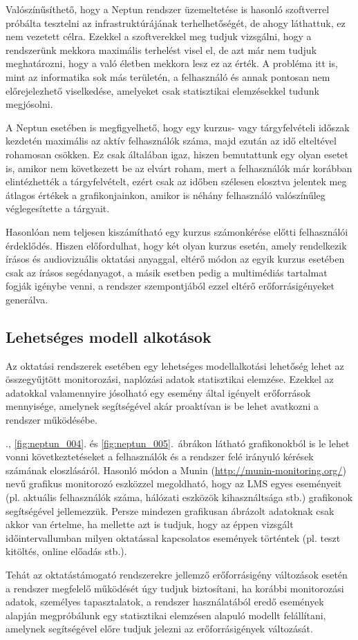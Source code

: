 Valószínűsíthető, hogy a Neptun rendszer üzemeltetése is hasonló szoftverrel próbálta tesztelni az infrastruktúrájának terhelhetőségét, de ahogy láthattuk, ez nem vezetett célra. Ezekkel a szoftverekkel meg tudjuk vizsgálni, hogy a rendszerünk mekkora maximális terhelést visel el, de azt már nem tudjuk meghatározni, hogy a való életben mekkora lesz ez az érték. A probléma itt is, mint az informatika sok más területén, a felhasználó és annak pontosan nem előrejelezhető viselkedése, amelyeket csak statisztikai elemzésekkel tudunk megjósolni.

A Neptun esetében is megfigyelhető, hogy egy kurzus- vagy tárgyfelvételi időszak kezdetén maximális az aktív felhasználók száma, majd ezután az idő elteltével rohamosan csökken. Ez csak általában igaz, hiszen bemutattunk egy olyan esetet is, amikor nem következett be az elvárt roham, mert a felhasználók már korábban elintézhették a tárgyfelvételt, ezért csak az időben szélesen elosztva jelentek meg átlagos értékek a grafikonjainkon, amikor is néhány felhasználó valószínűleg véglegesítette a tárgyait.

Hasonlóan nem teljesen kiszámítható egy kurzus számonkérése előtti felhasználói érdeklődés. Hiszen előfordulhat, hogy két olyan kurzus esetén, amely rendelkezik írásos és audiovizuális oktatási anyaggal, eltérő módon az egyik kurzus esetében csak az írásos segédanyagot, a másik esetben pedig a multimédiás tartalmat fogják igénybe venni, a rendszer szempontjából ezzel eltérő erőforrásigényeket generálva.

\subsection{Lehetséges modell alkotások}

Az oktatási rendszerek esetében egy lehetséges modellalkotási lehetőség lehet az összegyűjtött monitorozási, naplózási adatok statisztikai elemzése. Ezekkel az adatokkal valamennyire jósolható egy esemény által igényelt erőforrások mennyisége, amelynek segítségével akár proaktívan is be lehet avatkozni a rendszer működésébe.

., \ref{fig:neptun_004}. és \ref{fig:neptun_005}.~ábrákon látható grafikonokból is le lehet vonni következtetéseket a felhasználók és a rendszer felé irányuló kérések számának eloszlásáról. Hasonló módon a Munin (\href{http://munin-monitoring.org/}{http://munin-monitoring.org/}) nevű grafikus monitorozó eszközzel megoldható, hogy az LMS egyes eseményeit (pl. aktuális felhasználók száma, hálózati eszközök kihasználtsága stb.) grafikonok segítségével jellemezzük. Persze mindezen grafikusan ábrázolt adatoknak csak akkor van értelme, ha mellette azt is tudjuk, hogy az éppen vizsgált időintervallumban milyen oktatással kapcsolatos események történtek (pl. teszt kitöltés, online előadás stb.). 

Tehát az oktatástámogató rendszerekre jellemző erőforrásigény változások esetén a rendszer megfelelő működését úgy tudjuk biztosítani, ha korábbi monitorozási adatok, személyes tapasztalatok, a rendszer használatából eredő események alapján megpróbálunk egy statisztikai elemzésen alapuló modellt felállítani, amelynek segítségével előre tudjuk jelezni az erőforrásigények változását.
